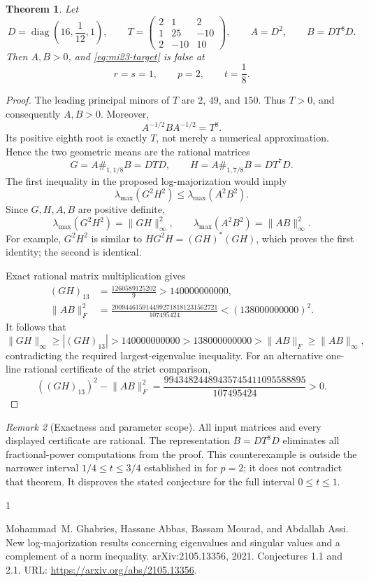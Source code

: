 \documentclass[10pt,a4paper]{article}
\newtheorem{theorem}{Theorem}[section]
\theoremstyle{remark}
\newtheorem{remark}[theorem]{Remark}
\newcommand{\diag}{\operatorname{diag}}
\newcommand{\norm}[1]{\lVert #1\rVert}
\newcommand{\opnorm}[1]{\lVert #1\rVert_{\infty}}
\begin{document}
\begin{theorem}\label{thm:mi23}
Let
\[
 D=\diag\left(16,\frac1{12},1\right),\qquad
 T=\begin{pmatrix}2&1&2\\1&25&-10\\2&-10&10\end{pmatrix},
 \qquad A=D^2,\qquad B=DT^8D.
\]
Then $A,B>0$, and \eqref{eq:mi23-target} is false at
\[
 r=s=1,\qquad p=2,\qquad t=\frac18.
\]
\end{theorem}
\begin{proof}
The leading principal minors of $T$ are $2$, $49$, and $150$. Thus $T>0$, and consequently $A,B>0$. Moreover,
\[
 A^{-1/2}BA^{-1/2}=T^8.
\]
Its positive eighth root is exactly $T$, not merely a numerical approximation. Hence the two geometric means are the rational matrices
\[
 G=A\#_{1,1/8}B=DTD,\qquad
 H=A\#_{1,7/8}B=DT^7D.
\]
The first inequality in the proposed log-majorization would imply
\[
 \lambda_{\max}(G^2H^2)\leq\lambda_{\max}(A^2B^2).
\]
Since $G,H,A,B$ are positive definite,
\[
 \lambda_{\max}(G^2H^2)=\opnorm{GH}^2,
 \qquad \lambda_{\max}(A^2B^2)=\opnorm{AB}^2.
\]
For example, $G^2H^2$ is similar to $HG^2H=(GH)^*(GH)$, which proves the first identity; the second is identical.

Exact rational matrix multiplication gives
\begin{align*}
 (GH)_{13}&=\frac{1260589125202}{9}>140000000000,\\
 \norm{AB}_F^2&=\frac{2009446159144992718181231562721}{107495424}
 <(138000000000)^2.
\end{align*}
It follows that
\[
 \opnorm{GH}\geq |(GH)_{13}|>140000000000
 >138000000000>\norm{AB}_F\geq\opnorm{AB},
\]
contradicting the required largest-eigenvalue inequality.
For an alternative one-line rational certificate of the strict comparison,
\[
 ((GH)_{13})^2-\norm{AB}_F^2
 =\frac{99434824489435745411095588895}{107495424}>0.
\]
\end{proof}

\begin{remark}[Exactness and parameter scope]
All input matrices and every displayed certificate are rational. The representation $B=DT^8D$ eliminates all fractional-power computations from the proof. This counterexample is outside the narrower interval $1/4\leq t\leq3/4$ established in \cite{GAMA2021} for $p=2$; it does not contradict that theorem. It disproves the stated conjecture for the full interval $0\leq t\leq1$.
\end{remark}

\begin{thebibliography}{1}

Mohammad~M. Ghabries, Hassane Abbas, Bassam Mourad, and Abdallah Assi.
\newblock New log-majorization results concerning eigenvalues and singular
  values and a complement of a norm inequality.
\newblock arXiv:2105.13356, 2021.
\newblock Conjectures 1.1 and 2.1.
\newblock URL: \url{https://arxiv.org/abs/2105.13356}.

\end{thebibliography}
\end{document}
